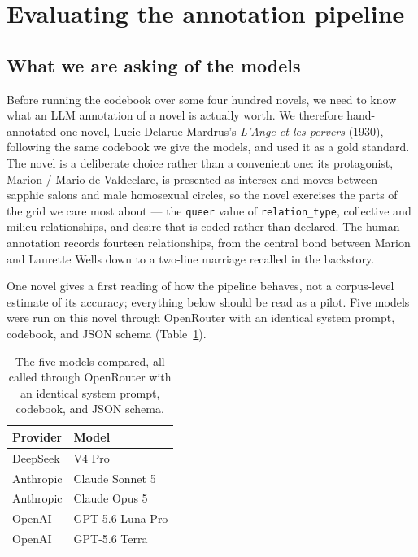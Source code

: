 %
\section{Evaluating the annotation pipeline}
\label{sec:evaluation}

\subsection{What we are asking of the models}

Before running the codebook over some four hundred novels, we need to know what an
LLM annotation of a novel is actually worth. We therefore hand-annotated one novel,
Lucie Delarue-Mardrus's \emph{L'Ange et les pervers} (1930), following the same
codebook we give the models, and used it as a gold standard. The novel is a
deliberate choice rather than a convenient one: its protagonist, Marion / Mario de
Valdeclare, is presented as intersex and moves between sapphic salons and male
homosexual circles, so the novel exercises the parts of the grid we care most about
--- the \texttt{queer} value of \texttt{relation\_type}, collective and milieu
relationships, and desire that is coded rather than declared. The human annotation
records fourteen relationships, from the central bond between Marion and Laurette
Wells down to a two-line marriage recalled in the backstory.

One novel gives a first reading of how the pipeline behaves, not a corpus-level
estimate of its accuracy; everything below should be read as a pilot. Five models
were run on this novel through OpenRouter with an identical system prompt, codebook,
and JSON schema (Table~\ref{tab:models}).

\begin{table}[h]
  \centering
  \small
  \begin{tabular}{ll}
    \toprule
    Provider & Model \\
    \midrule
    DeepSeek  & V4 Pro \\
    Anthropic & Claude Sonnet 5 \\
    Anthropic & Claude Opus 5 \\
    OpenAI    & GPT-5.6 Luna Pro \\
    OpenAI    & GPT-5.6 Terra \\
    \bottomrule
  \end{tabular}
  \caption{The five models compared, all called through OpenRouter with an identical
  system prompt, codebook, and JSON schema.}
  \label{tab:models}
\end{table}

